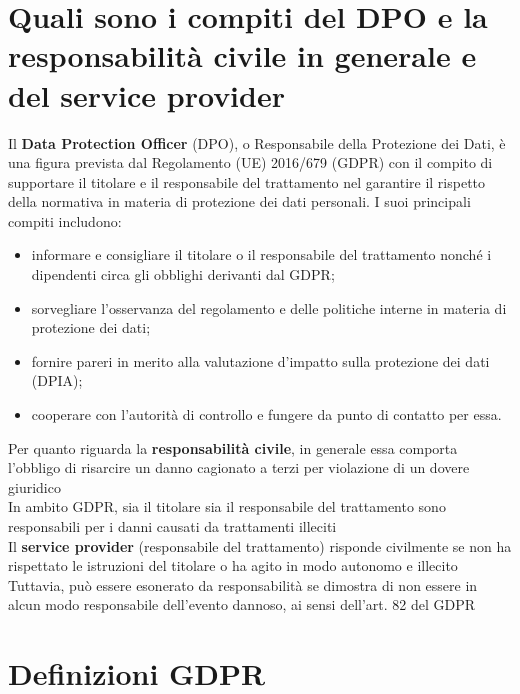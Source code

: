 \documentclass[8pt,oneside,a4paper]{article}
\begin{document}
	\section{Quali sono i compiti del DPO e la responsabilità civile in generale e del service provider}
	Il \textbf{Data Protection Officer} (DPO), o Responsabile della Protezione dei Dati, è una figura prevista dal Regolamento (UE) 2016/679 (GDPR) con il compito di supportare il titolare e il responsabile del trattamento nel garantire il rispetto della normativa in materia di protezione dei dati personali. I suoi principali compiti includono:
	\begin{itemize}
		\item informare e consigliare il titolare o il responsabile del trattamento nonché i dipendenti circa gli obblighi derivanti dal GDPR;
		\item sorvegliare l'osservanza del regolamento e delle politiche interne in materia di protezione dei dati;
		\item fornire pareri in merito alla valutazione d'impatto sulla protezione dei dati (DPIA);
		\item cooperare con l'autorità di controllo e fungere da punto di contatto per essa.
	\end{itemize}
	Per quanto riguarda la \textbf{responsabilità civile}, in generale essa comporta l'obbligo di risarcire un danno cagionato a terzi per violazione di un dovere giuridico\\
	In ambito GDPR, sia il titolare sia il responsabile del trattamento sono responsabili per i danni causati da trattamenti illeciti\\
	Il \textbf{service provider} (responsabile del trattamento) risponde civilmente se non ha rispettato le istruzioni del titolare o ha agito in modo autonomo e illecito\\
	Tuttavia, può essere esonerato da responsabilità se dimostra di non essere in alcun modo responsabile dell’evento dannoso, ai sensi dell’art. 82 del GDPR
	\section{Definizioni GDPR}
\end{document}
